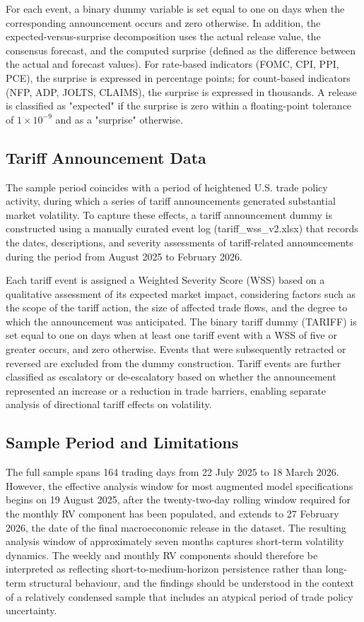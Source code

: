 \documentclass[12pt,a4paper]{report}
\begin{document}
For each event, a binary dummy variable is set equal to one on days when the corresponding announcement occurs and zero otherwise. In addition, the expected-versus-surprise decomposition uses the actual release value, the consensus forecast, and the computed surprise (defined as the difference between the actual and forecast values). For rate-based indicators (FOMC, CPI, PPI, PCE), the surprise is expressed in percentage points; for count-based indicators (NFP, ADP, JOLTS, CLAIMS), the surprise is expressed in thousands. A release is classified as "expected" if the surprise is zero within a floating-point tolerance of $1 \times 10^{-9}$ and as a "surprise" otherwise.

\subsection{Tariff Announcement Data}
The sample period coincides with a period of heightened U.S. trade policy activity, during which a series of tariff announcements generated substantial market volatility. To capture these effects, a tariff announcement dummy is constructed using a manually curated event log (tariff_wss_v2.xlsx) that records the dates, descriptions, and severity assessments of tariff-related announcements during the period from August 2025 to February 2026.

Each tariff event is assigned a Weighted Severity Score (WSS) based on a qualitative assessment of its expected market impact, considering factors such as the scope of the tariff action, the size of affected trade flows, and the degree to which the announcement was anticipated. The binary tariff dummy (TARIFF) is set equal to one on days when at least one tariff event with a WSS of five or greater occurs, and zero otherwise. Events that were subsequently retracted or reversed are excluded from the dummy construction. Tariff events are further classified as escalatory or de-escalatory based on whether the announcement represented an increase or a reduction in trade barriers, enabling separate analysis of directional tariff effects on volatility.

\subsection{Sample Period and Limitations}
The full sample spans 164 trading days from 22 July 2025 to 18 March 2026. However, the effective analysis window for most augmented model specifications begins on 19 August 2025, after the twenty-two-day rolling window required for the monthly RV component has been populated, and extends to 27 February 2026, the date of the final macroeconomic release in the dataset. The resulting analysis window of approximately seven months captures short-term volatility dynamics. The weekly and monthly RV components should therefore be interpreted as reflecting short-to-medium-horizon persistence rather than long-term structural behaviour, and the findings should be understood in the context of a relatively condensed sample that includes an atypical period of trade policy uncertainty.
\end{document}
